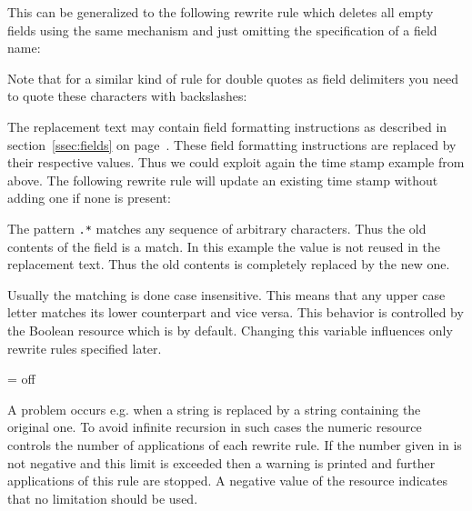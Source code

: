 \documentclass[11pt,a4paper]{scrbook}
\begin{document}
This can be generalized to the following rewrite rule which deletes all empty
fields using the same mechanism and just omitting the specification of a field
name:

\begin{Resources}
\end{Resources}

Note that for a similar kind of rule for double quotes as field delimiters you
need to quote these characters with backslashes:

\begin{Resources}
\end{Resources}


The replacement text may contain field formatting instructions as described in
section~\ref{ssec:fields} on page~\pageref{ssec:fields}. These field
formatting instructions are replaced by their respective values. Thus we could
exploit again the time stamp example from above. The following rewrite rule
will update an existing time stamp without adding one if none is present:

\begin{Resources}
\end{Resources}

The pattern \verb|.*| matches any sequence of arbitrary characters. Thus the
old contents of the field is a match. In this example the value is not reused
in the replacement text. Thus the old contents is completely replaced by the
new one.

Usually the matching is done case insensitive. This means that any upper case
letter matches its lower counterpart and vice versa. This behavior is
controlled by the Boolean resource  which is
 by default. Changing this variable influences only rewrite rules
specified later.

\begin{Resources}
   = off
\end{Resources}

A problem occurs e.g. when a string is replaced by a string containing the
original one. To avoid infinite recursion in such cases the numeric resource
 controls the number of applications of each rewrite rule.
If the number given in  is not negative and this limit is
exceeded then a warning is printed and further applications of this rule are
stopped. A negative value of the resource  indicates that
no limitation should be used.
\end{document}
